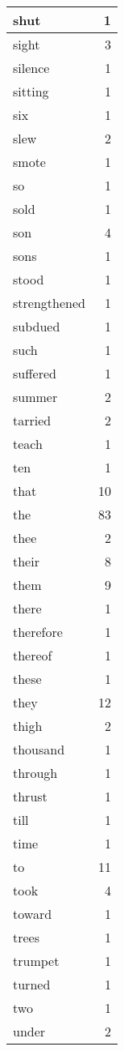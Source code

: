 \begin{center}
\begin{longtable}{l|r}
shut & 1 \\ \hline
sight & 3 \\ \hline
silence & 1 \\ \hline
sitting & 1 \\ \hline
six & 1 \\ \hline
slew & 2 \\ \hline
smote & 1 \\ \hline
so & 1 \\ \hline
sold & 1 \\ \hline
son & 4 \\ \hline
sons & 1 \\ \hline
stood & 1 \\ \hline
strengthened & 1 \\ \hline
subdued & 1 \\ \hline
such & 1 \\ \hline
suffered & 1 \\ \hline
summer & 2 \\ \hline
tarried & 2 \\ \hline
teach & 1 \\ \hline
ten & 1 \\ \hline
that & 10 \\ \hline
the & 83 \\ \hline
thee & 2 \\ \hline
their & 8 \\ \hline
them & 9 \\ \hline
there & 1 \\ \hline
therefore & 1 \\ \hline
thereof & 1 \\ \hline
these & 1 \\ \hline
they & 12 \\ \hline
thigh & 2 \\ \hline
thousand & 1 \\ \hline
through & 1 \\ \hline
thrust & 1 \\ \hline
till & 1 \\ \hline
time & 1 \\ \hline
to & 11 \\ \hline
took & 4 \\ \hline
toward & 1 \\ \hline
trees & 1 \\ \hline
trumpet & 1 \\ \hline
turned & 1 \\ \hline
two & 1 \\ \hline
under & 2 \\ \hline

\end{longtable}
\end{center}
